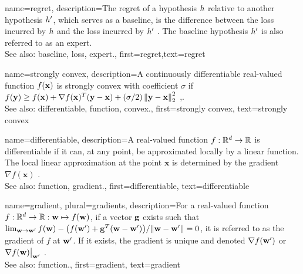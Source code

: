 {name={regret},
	description={The regret of a \gls{hypothesis} $h$ relative to 
		another \gls{hypothesis} $h'$, which serves as a \gls{baseline}, 
		is the difference between the \gls{loss} incurred by $h$ and the \gls{loss} 
		incurred by $h'$ \cite{PredictionLearningGames}. 
		The \gls{baseline} \gls{hypothesis} $h'$ is also referred to as an \gls{expert}.
					\\ 
		See also: \gls{baseline}, \gls{loss}, \gls{expert}.},
	first={regret},text={regret} 
}

{name={strongly convex},
	description={A continuously \gls{differentiable} real-valued 
		\gls{function} $f({\bf x})$ is strongly \gls{convex} with coefficient $\sigma$ if $f({\bf y}) \geq f({\bf x}) + \nabla f({\bf x})^{T} ({\bf y} - {\bf x}) + (\sigma/2) \left\Vert {{\bf y}- {\bf x}} \right\Vert_{2}^{2}$ \cite{nesterov04},\cite[Sec. B.1.1]{CvxAlgBertsekas}.
					\\ 
		See also: \gls{differentiable}, \gls{function}, \gls{convex}.},
	first={strongly convex},
	text={strongly convex} 
}

{name={differentiable},
	description={A real-valued \gls{function} $f: \mathbb{R}^{d} \rightarrow \mathbb{R}$ 
		is differentiable if it can, at any point, be approximated locally by a linear 
		\gls{function}. The local linear approximation at the point $\mathbf{x}$ is determined 
		by the \gls{gradient} $\nabla f ( \mathbf{x})$ \cite{RudinBookPrinciplesMatheAnalysis}.
					\\ 
		See also: \gls{function}, \gls{gradient}.},
	first={differentiable},
	text={differentiable} 
}

{name={gradient}, plural={gradients},
	description={For a real-valued \gls{function} 
		$f: \mathbb{R}^{d} \rightarrow \mathbb{R}: {\bf w} \mapsto f({\bf w})$, 
		if a vector ${\bf g}$ exists such that 
		$\lim_{{\bf w} \rightarrow {\bf w}'} {f({\bf w}) - \big(f({\bf w}') + {\bf g}^{T} ({\bf w} - {\bf w}') \big) }/{\| {\bf w} - {\bf w}'\|}=0$, 
		it is referred to as the gradient of $f$ at ${\bf w}'$. If it exists, the gradient is unique and 
		denoted $\nabla f({\bf w}')$ or $\nabla f({\bf w})\big|_{{\bf w}'}$ \cite{RudinBookPrinciplesMatheAnalysis}.
		\\
		See also: \gls{function}.},
	first={gradient},
	text={gradient} 
}

